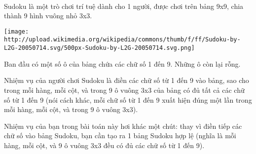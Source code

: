  

Sudoku là một trò chơi trí tuệ dành cho 1 người, được chơi trên bảng 9x9, chia thành 9 hình vuông nhỏ 3x3.


\texttt{[image: http://upload.wikimedia.org/wikipedia/commons/thumb/f/ff/Sudoku-by-L2G-20050714.svg/500px-Sudoku-by-L2G-20050714.svg.png]}

Ban đầu có một số ô của bảng chứa các chữ số 1 đến 9. Những ô còn lại rỗng.

Nhiệm vụ của người chơi Sudoku là điền các chữ số từ 1 đến 9 vào bảng, sao cho trong mỗi hàng, mỗi cột, và trong 9 ô vuông 3x3 của bảng có đủ tất cả các chữ số từ 1 đến 9 (nói cách khác, mỗi chữ số từ 1 đến 9 xuất hiện đúng một lần trong mỗi hàng, mỗi cột, và trong 9 ô vuông 3x3).

Nhiệm vụ của bạn trong bài toán này hơi khác một chút: thay vì điền tiếp các chữ số vào bảng Sudoku, bạn cần tạo ra 1 bảng Sudoku hợp lệ (nghĩa là mỗi hàng, mỗi cột, và 9 ô vuông 3x3 đều có đủ các chữ số từ 1 đến 9).